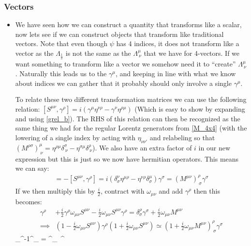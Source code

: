 \documentclass[11pt]{article}
\renewenvironment{flalign}{\vspace{-3mm}\empheq[box=\tcbhighmath]{align}}{\endempheq}
\numberwithin{equation}{section}
\begin{document}
\subsubsection{Vectors}
\begin{itemize}
  \item We have seen how we can construct a quantity that transforms like a scalar, now lets see if we can construct objects that transform like traditional vectors. Note that even though $\psi$ has 4 indices, it does not transform like a vector as the $\Lambda_{\frac{1}{2}}$ is not the same as the $\Lambda^{\mu}_{~\nu}$ that we have for 4-vectors. If we want something to transform like a vector we somehow need it to ``create'' $\Lambda^{\mu}_{~\nu}$. Naturally this leads us to the $\gamma^{\mu}$, and keeping in line with what we know about indices we can gather that it probably should only involve a single $\gamma^{\mu}$. 

  To relate these two different transformation matrices we can use the following relation: $[S^{\mu\nu},\gamma^{\rho}] = i(\gamma^{\mu}\eta^{\nu\rho}-\gamma^{\nu}\eta^{\rho\mu})$ (Which is easy to show by expanding and using \ref{grel_b}). The RHS of this relation can then be recognized as the same thing we had for the regular Lorentz generators from \ref{M_4x4} (with the lowering of a single index by acting with $\eta_{\nu\nu'}$ and relabeling so that $(M^{\rho\sigma})^{\mu}_{~\nu} = \eta^{\rho\mu}\delta^{\sigma}_{~\nu}-\eta^{\sigma\mu}\delta^{\rho}_{~\nu}$). We also have an extra factor of $i$ in our new expression but this is just so we now have hermitian operators.  This means we can say:
  \begin{align*}
     [\gamma^{\rho},S^{\mu\nu}]=-[S^{\mu\nu},\gamma^{\rho}] = i(\delta^{\nu}_{\sigma}\eta^{\mu\rho}-\eta^{\nu\rho}\delta^{\mu}_{\sigma})\gamma^{\sigma} = (M^{\mu\nu})^{\rho}_{~\sigma}\gamma^{\sigma}
   \end{align*}
   If we then multiply this by $\frac{i}{2}$, contract with $\omega_{\mu\nu}$ and add $\gamma^{\rho}$ then this becomes:
   \begin{align*}
     \gamma^{\rho}& +\frac{i}{2}\gamma^{\rho}\omega_{\mu\nu}S^{\mu\nu}-\frac{i}{2}\omega_{\mu\nu}S^{\mu\nu}\gamma^{\rho} = \delta^{\rho}_{\sigma}\gamma^{\sigma}+\frac{i}{2}\omega_{\mu\nu}M^{\mu\nu} \\
      \implies & (1-\frac{i}{2}\omega_{\mu\nu}S^{\mu\nu})\gamma^{\rho}(1+\frac{i}{2}\omega_{\mu\nu}S^{\mu\nu}) \simeq (1+\frac{i}{2}\omega_{\mu\nu}M^{\mu\nu})^{\rho}_{~\sigma}\gamma^{\sigma}
   \end{align*}
   \begin{flalign}
     \implies \Lambda_{}^{-1}\gamma^{\rho}\Lambda_{} = \Lambda^{\rho}_{~\sigma}\gamma^{\sigma}
   \end{flalign}


\end{itemize}
\end{document}
